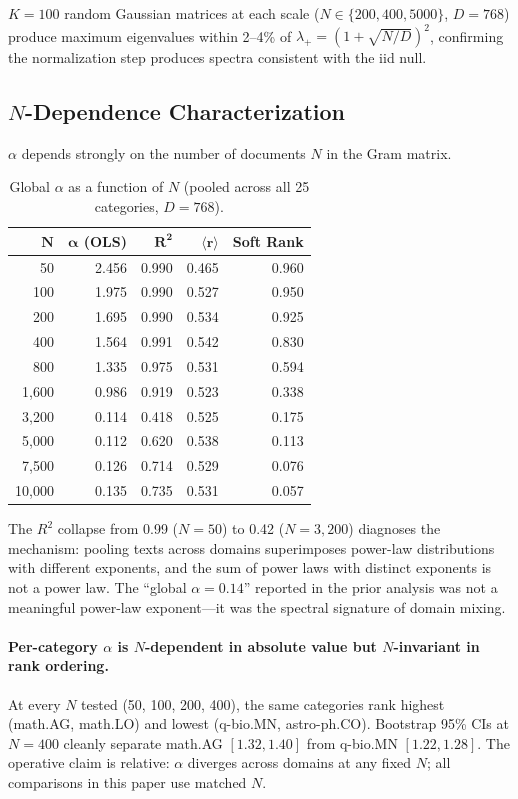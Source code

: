 \documentclass[12pt,letterpaper]{article}
\newcommand{\rbar}{\langle r \rangle}
\newcommand{\al}{\alpha}
\newcommand{\mpedge}{\lambda_+}
\begin{document}
$K = 100$ random Gaussian matrices at each scale ($N \in \{200,
400, 5000\}$, $D = 768$) produce maximum eigenvalues within 2--4\%
of $\mpedge = (1 + \sqrt{N/D})^2$, confirming the normalization
step produces spectra consistent with the iid null.

\subsection{$N$-Dependence Characterization}
\label{sec:ndep}

$\al$ depends strongly on the number of documents $N$ in the Gram
matrix.

\begin{table}[H]
\centering
\caption{Global $\al$ as a function of $N$ (pooled across all 25
categories, $D = 768$).}
\label{tab:ndep}
\begin{tabular}{rrrrr}
\toprule
$\boldsymbol{N}$ & $\boldsymbol{\al}$ \textbf{(OLS)} &
$\boldsymbol{R^2}$ & $\boldsymbol{\rbar}$ & \textbf{Soft Rank} \\
\midrule
50 & 2.456 & 0.990 & 0.465 & 0.960 \\
100 & 1.975 & 0.990 & 0.527 & 0.950 \\
200 & 1.695 & 0.990 & 0.534 & 0.925 \\
400 & 1.564 & 0.991 & 0.542 & 0.830 \\
800 & 1.335 & 0.975 & 0.531 & 0.594 \\
1{,}600 & 0.986 & 0.919 & 0.523 & 0.338 \\
3{,}200 & 0.114 & 0.418 & 0.525 & 0.175 \\
5{,}000 & 0.112 & 0.620 & 0.538 & 0.113 \\
7{,}500 & 0.126 & 0.714 & 0.529 & 0.076 \\
10{,}000 & 0.135 & 0.735 & 0.531 & 0.057 \\
\bottomrule
\end{tabular}
\end{table}

The $R^2$ collapse from 0.99 ($N = 50$) to 0.42 ($N = 3{,}200$)
diagnoses the mechanism: pooling texts across domains superimposes
power-law distributions with different exponents, and the sum of
power laws with distinct exponents is not a power law.  The
``global $\al = 0.14$'' reported in the prior analysis was not a
meaningful power-law exponent---it was the spectral signature of
domain mixing.

\paragraph{Per-category $\al$ is $N$-dependent in absolute value
but $N$-invariant in rank ordering.}  At every $N$ tested (50, 100,
200, 400), the same categories rank highest (math.AG, math.LO) and
lowest (q-bio.MN, astro-ph.CO).  Bootstrap 95\% CIs at $N = 400$
cleanly separate math.AG $[1.32, 1.40]$ from q-bio.MN
$[1.22, 1.28]$.  The operative claim is relative: $\al$ diverges
across domains at any fixed $N$; all comparisons in this paper use
matched $N$.
\end{document}
